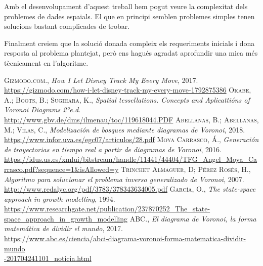 \documentclass[12pt]{article}
\begin{document}
Amb el desenvolupament d’aquest treball hem pogut veure la complexitat dels problemes de dades espaials. El que en principi semblen problemes simples tenen solucions bastant complicades de trobar.

Finalment creiem que la solució donada compleix els requeriments inicials i dona resposta al problema plantejat, però ens hagués agradat aprofundir una mica més tècnicament en l’algoritme.

\clearpage
\begin{thebibliography}{9}
 \textsc{Gizmodo.com.}, \textit{How I Let Disney Track My Every Move}, 2017. 
\\\textcolor{blue}{\url{https://gizmodo.com/how-i-let-disney-track-my-every-move-1792875386}}	
 \textsc{Okabe, A.}; \textsc{Boots, B.}; \textsc{Sugihara, K.}, \textit{Spatial tessellations. Concepts and Aplicattións of \textit{Voronoi} Diagrams 2ºe.d}. 
\\\textcolor{blue}{\url{http://www.gbv.de/dms/ilmenau/toc/119618044.PDF}}
 \textsc{Abellanas, B.}; \textsc{Abellanas, M.}; \textsc{Vilas, C.}, \textit{Modelización de bosques mediante diagramas de \textit{Voronoi}}, 2018. 
\\\textcolor{blue}{\url{https://www.infor.uva.es/egc07/articulos/28.pdf}}
 \textsc{Moya Carrasco, Á.}, \textit{Generación de trayectorias en tiempo real a partir de diagramas de \textit{Voronoi}}, 2016. \\\textcolor{blue}{\url{https://idus.us.es/xmlui/bitstream/handle/11441/44404/TFG_Angel_Moya_Carrasco.pdf?sequence=1&isAllowed=y}}
 \textsc{Trinchet Almaguer, D}; \textsc{Pérez Rosés, H.}, \textit{Algoritmo para solucionar el problema inverso generalizado de \textit{Voronoi}}, 2007. 
\\\textcolor{blue}{\url{http://www.redalyc.org/pdf/3783/378343634005.pdf}}
 \textsc{García, O.}, \textit{The state-space approach in growth modelling}, 1994. 
\\\textcolor{blue}{\url{https://www.researchgate.net/publication/237870252_The_state-space_approach_in_growth_modelling}}
 \textsc{ABC.}, \textit{El diagrama de \textit{Voronoi}, la forma matemática de dividir el mundo}, 2017. 
\\\textcolor{blue}{\url{https://www.abc.es/ciencia/abci-diagrama-voronoi-forma-matematica-dividir-mundo}}
\\\textcolor{blue}{\url{-201704241101_noticia.html}}
\end{thebibliography}
\end{document}
